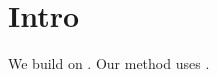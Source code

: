 \documentclass{article}
\begin{document}
\section{Intro}
We build on \cite{he2016deep}.
Our method uses \cite{myproceedings2016}.

\end{document}
